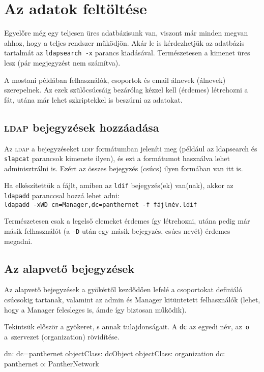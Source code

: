 \section{Az adatok feltöltése}
Egyelőre még egy teljesen üres adatbázisunk van, viszont már minden megvan ahhoz, hogy a teljes rendszer működjön. Akár
le is kérdezhetjük az adatbázis tartalmát az \texttt{ldapsearch -x} parancs kiadásával. Természetesen a kimenet üres
lesz (pár megjegyzést nem számítva).

A mostani példában felhasználók, csoportok és email álnevek (álnevek) szerepelnek. Az ezek szülőcsúcsáig bezárólag
kézzel kell (érdemes) létrehozni a fát, utána már lehet szkriptekkel is beszúrni az adatokat.

\subsection{\textsc{ldap} bejegyzések hozzáadása}

Az \textsc{ldap} a bejegyzéseket \textsc{ldif} formátumban jeleníti meg (például az ldapsearch és \texttt{slapcat}
parancsok kimenete ilyen), és ezt a formátumot használva lehet adminisztrálni is. Ezért az összes bejegyzés (csúcs)
ilyen formában van itt is.

Ha elkészítettük a fájlt, amiben az \texttt{ldif} bejegyzés(ek) van(nak), akkor az \texttt{ldapadd} paranccsal hozzá lehet adni:\\
\texttt{ldapadd -xWD cn=Manager,dc=panthernet -f fájlnév.ldif}

Természetesen csak a legelső elemeket érdemes így létrehozni, utána pedig már másik felhasználót (a \texttt{-D} után egy
másik bejegyzés, csúcs nevét) érdemes megadni.


\subsection{Az alapvető bejegyzések}

Az alapvető bejegyzések a gyökértől kezdődően lefelé a csoportokat definiáló csúcsokig tartanak, valamint az admin és
Manager kitüntetett felhasználók (lehet, hogy a Manager felesleges is, ámde így biztosan működik).

Tekintsük először a gyökeret, s annak tulajdonságait.
A \texttt{dc} az egyedi név, az~\texttt{o} a~szervezet (organization) rövidítése.

\begin{VerbExample}
dn: dc=panthernet
objectClass: dcObject
objectClass: organization
dc: panthernet
o: PantherNetwork  
\end{VerbExample}


